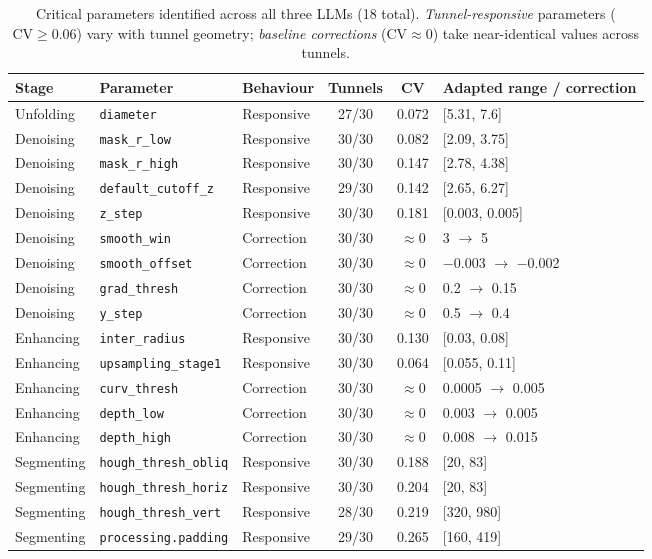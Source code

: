 \documentclass[a4paper,fleqn]{cas-dc}
\begin{document}
{\begin{table}[t]
\caption{Critical parameters identified across all three LLMs (18 total). \emph{Tunnel-responsive} parameters ($\text{CV} \geq 0.06$) vary with tunnel geometry; \emph{baseline corrections} ($\text{CV} \approx 0$) take near-identical values across tunnels.}\label{tab:critical-params}
\begin{tabular*}{\textwidth}{@{\extracolsep{\fill}} l l l c c l @{}}
\toprule
Stage & Parameter & Behaviour & Tunnels & CV & Adapted range / correction \\
\midrule
Unfolding & \texttt{diameter} & Responsive & 27/30 & 0.072 & [5.31, 7.6] \\
\midrule
Denoising & \texttt{mask\_r\_low} & Responsive & 30/30 & 0.082 & [2.09, 3.75] \\
Denoising & \texttt{mask\_r\_high} & Responsive & 30/30 & 0.147 & [2.78, 4.38] \\
Denoising & \texttt{default\_cutoff\_z} & Responsive & 29/30 & 0.142 & [2.65, 6.27] \\
Denoising & \texttt{z\_step} & Responsive & 30/30 & 0.181 & [0.003, 0.005] \\
Denoising & \texttt{smooth\_win} & Correction & 30/30 & $\approx$0 & 3 $\rightarrow$ 5 \\
Denoising & \texttt{smooth\_offset} & Correction & 30/30 & $\approx$0 & $-$0.003 $\rightarrow$ $-$0.002 \\
Denoising & \texttt{grad\_thresh} & Correction & 30/30 & $\approx$0 & 0.2 $\rightarrow$ 0.15 \\
Denoising & \texttt{y\_step} & Correction & 30/30 & $\approx$0 & 0.5 $\rightarrow$ 0.4 \\
\midrule
Enhancing & \texttt{inter\_radius} & Responsive & 30/30 & 0.130 & [0.03, 0.08] \\
Enhancing & \texttt{upsampling\_stage1} & Responsive & 30/30 & 0.064 & [0.055, 0.11] \\
Enhancing & \texttt{curv\_thresh} & Correction & 30/30 & $\approx$0 & 0.0005 $\rightarrow$ 0.005 \\
Enhancing & \texttt{depth\_low} & Correction & 30/30 & $\approx$0 & 0.003 $\rightarrow$ 0.005 \\
Enhancing & \texttt{depth\_high} & Correction & 30/30 & $\approx$0 & 0.008 $\rightarrow$ 0.015 \\
\midrule
Segmenting & \texttt{hough\_thresh\_obliq} & Responsive & 30/30 & 0.188 & [20, 83] \\
Segmenting & \texttt{hough\_thresh\_horiz} & Responsive & 30/30 & 0.204 & [20, 83] \\
Segmenting & \texttt{hough\_thresh\_vert} & Responsive & 28/30 & 0.219 & [320, 980] \\
Segmenting & \texttt{processing.padding} & Responsive & 29/30 & 0.265 & [160, 419] \\
\bottomrule
\end{tabular*}
\end{table}

}
\end{document}
